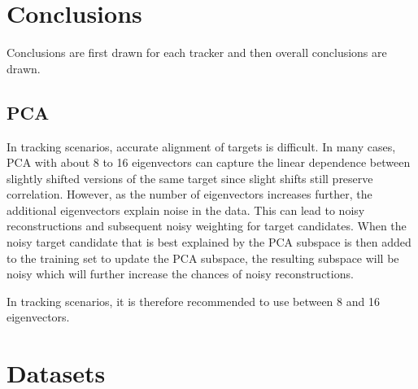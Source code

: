 \section{Conclusions}
Conclusions are first drawn for each tracker and then overall conclusions are drawn.

\subsection{PCA}
In tracking scenarios, accurate alignment of targets is difficult.  In many cases, PCA with about 8 to 16 eigenvectors can capture the linear dependence between slightly shifted versions of the same target since slight shifts still preserve correlation.  However, as the number of eigenvectors increases further, the additional eigenvectors explain noise in the data.  This can lead to noisy reconstructions and subsequent noisy weighting for target candidates.  When the noisy target candidate that is best explained by the PCA subspace is then added to the training set to update the PCA subspace, the resulting subspace will be noisy which will further increase the chances of noisy reconstructions.  

In tracking scenarios, it is therefore recommended to use between 8 and 16 eigenvectors.

\appendix
\clearpage
\newpage
\section{Datasets}
\label{App:dataset_snapshots}

